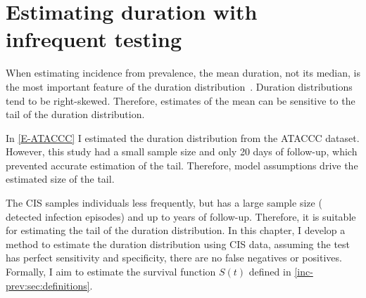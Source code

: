 \documentclass[thesis.tex]{subfiles}
\begin{document}
\ifSubfilesClassLoaded{


\setcounter{chapter}{4}
}

\chapter{Estimating duration with infrequent testing} \label{perf-test}

When estimating incidence from prevalence, the mean duration, not its median, is the most important feature of the duration distribution~\autocite{freemanPrevalence}.
Duration distributions tend to be right-skewed.
Therefore, estimates of the mean can be sensitive to the tail of the duration distribution.

In \cref{E-ATACCC} I estimated the duration distribution from the ATACCC dataset.
However, this study had a small sample size and only 20 days of follow-up, which prevented accurate estimation of the tail.
Therefore, model assumptions drive the estimated size of the tail.

The CIS samples individuals less frequently, but has a large sample size ( detected infection episodes) and up to years of follow-up.
Therefore, it is suitable for estimating the tail of the duration distribution.
In this chapter, I develop a method to estimate the duration distribution using CIS data, assuming the test has perfect sensitivity and specificity, \ie there are no false negatives or positives.
Formally, I aim to estimate the survival function $S(t)$ defined in \cref{inc-prev:sec:definitions}.
\end{document}
